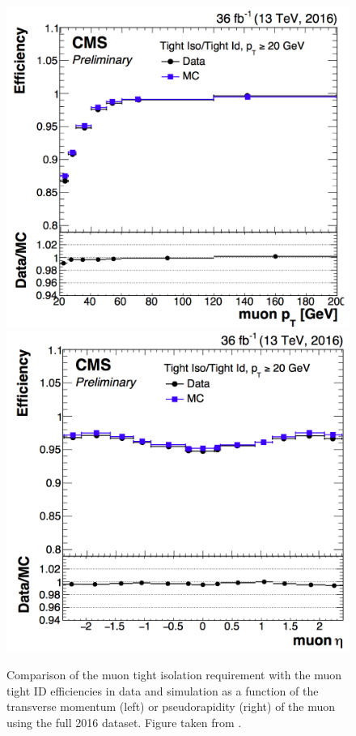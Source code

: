 \begin{figure}[htbp]
	\centering
	\includegraphics[width=0.494\linewidth]{4_EventRecoSelect/Figures/TightIsovsot}
	\includegraphics[width=0.494\linewidth]{4_EventRecoSelect/Figures/TightIsovseta}
	\caption{Comparison of the muon tight isolation requirement with the muon tight ID  efficiencies in data and simulation as a function of the transverse momentum (left) or  pseudorapidity (right) of the muon using the full 2016 dataset. Figure taken from \cite{CMS-DP-2017-007}.}
	\label{fig:muoniso}
\end{figure}
